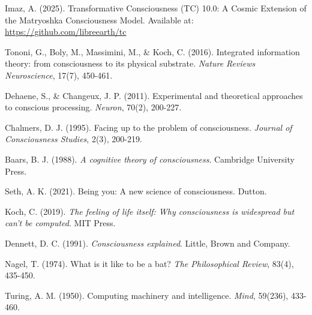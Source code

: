 \documentclass[12pt]{article}
\begin{document}

\begin{thebibliography}{99}
     Imaz, A. (2025). Transformative Consciousness (TC) 10.0: A Cosmic Extension of the Matryoshka Consciousness Model. Available at: \url{https://github.com/libreearth/tc}
    
     Tononi, G., Boly, M., Massimini, M., \& Koch, C. (2016). Integrated information theory: from consciousness to its physical substrate. \emph{Nature Reviews Neuroscience}, 17(7), 450-461.
    
     Dehaene, S., \& Changeux, J. P. (2011). Experimental and theoretical approaches to conscious processing. \emph{Neuron}, 70(2), 200-227.
    
     Chalmers, D. J. (1995). Facing up to the problem of consciousness. \emph{Journal of Consciousness Studies}, 2(3), 200-219.
    
     Baars, B. J. (1988). \emph{A cognitive theory of consciousness}. Cambridge University Press.
    
     Seth, A. K. (2021). Being you: A new science of consciousness. Dutton.
    
     Koch, C. (2019). \emph{The feeling of life itself: Why consciousness is widespread but can't be computed}. MIT Press.
    
     Dennett, D. C. (1991). \emph{Consciousness explained}. Little, Brown and Company.
    
     Nagel, T. (1974). What is it like to be a bat? \emph{The Philosophical Review}, 83(4), 435-450.
    
     Turing, A. M. (1950). Computing machinery and intelligence. \emph{Mind}, 59(236), 433-460.
\end{thebibliography}
\end{document}
